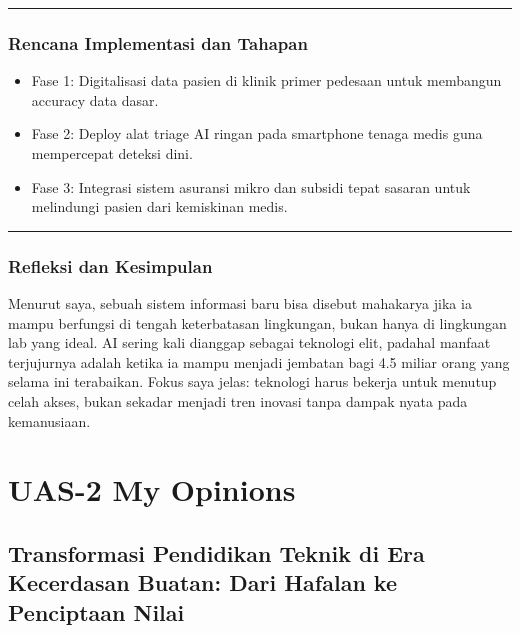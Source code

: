 \documentclass[
  letterpaper,
  DIV=11,
  numbers=noendperiod]{scrreprt}
\providecommand{\tightlist}{%
  \setlength{\itemsep}{0pt}\setlength{\parskip}{0pt}}
\begin{document}
\begin{center}\rule{0.5\linewidth}{0.5pt}\end{center}

\subsection{Rencana Implementasi dan
Tahapan}\label{rencana-implementasi-dan-tahapan}

\begin{itemize}
\tightlist
\item
  Fase 1: Digitalisasi data pasien di klinik primer pedesaan untuk
  membangun accuracy data dasar.
\item
  Fase 2: Deploy alat triage AI ringan pada smartphone tenaga medis guna
  mempercepat deteksi dini.
\item
  Fase 3: Integrasi sistem asuransi mikro dan subsidi tepat sasaran
  untuk melindungi pasien dari kemiskinan medis.
\end{itemize}

\begin{center}\rule{0.5\linewidth}{0.5pt}\end{center}

\subsection{Refleksi dan Kesimpulan}\label{refleksi-dan-kesimpulan}

Menurut saya, sebuah sistem informasi baru bisa disebut mahakarya jika
ia mampu berfungsi di tengah keterbatasan lingkungan, bukan hanya di
lingkungan lab yang ideal. AI sering kali dianggap sebagai teknologi
elit, padahal manfaat terjujurnya adalah ketika ia mampu menjadi
jembatan bagi 4.5 miliar orang yang selama ini terabaikan. Fokus saya
jelas: teknologi harus bekerja untuk menutup celah akses, bukan sekadar
menjadi tren inovasi tanpa dampak nyata pada kemanusiaan.


\chapter{UAS-2 My Opinions}\label{uas-2-my-opinions}

\section{Transformasi Pendidikan Teknik di Era Kecerdasan Buatan: Dari
Hafalan ke Penciptaan
Nilai}\label{transformasi-pendidikan-teknik-di-era-kecerdasan-buatan-dari-hafalan-ke-penciptaan-nilai}
\end{document}
